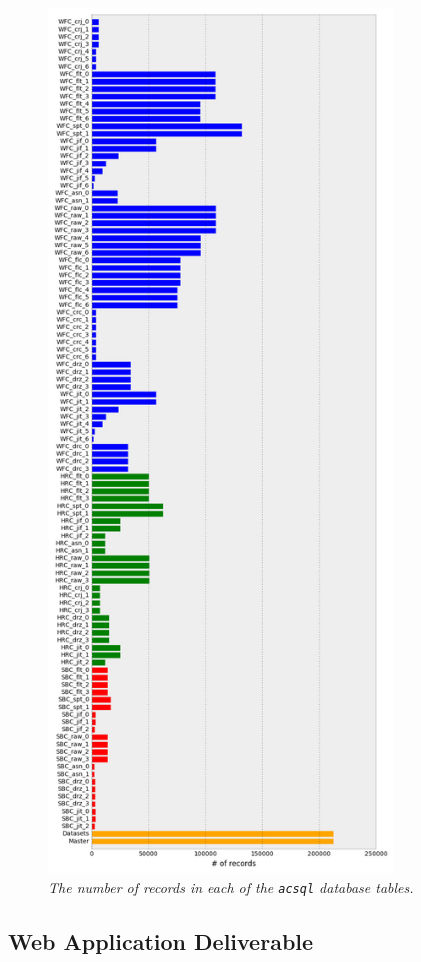\documentclass[10pt,journal,compsoc]{IEEEtran}
\begin{document}
\begin{figure}[!h]
\centering
\includegraphics[width=3.6in]{./figures/database_records.png}
\caption{\textit{The number of records in each of the \texttt{acsql} database tables.}}
\label{fig30}
\end{figure}


\subsection{Web Application Deliverable} \label{sec4.3}
\end{document}
